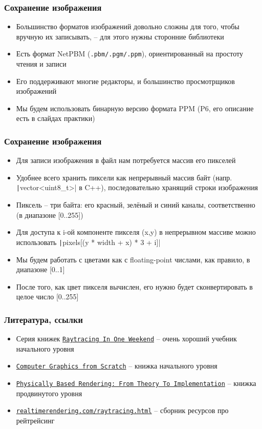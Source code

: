 \documentclass[10pt]{beamer}
\begin{document}
\begin{frame}
\frametitle{Сохранение изображения}
\begin{itemize}
\item Большинство форматов изображений довольно сложны для того, чтобы вручную их записывать, -- для этого нужны сторонние библиотеки
\pause
\item Есть формат NetPBM (\texttt{.pbm/.pgm/.ppm}), ориентированный на простоту чтения и записи
\pause
\item Его поддерживают многие редакторы, и большинство просмотрщиков изображений
\pause
\item Мы будем использовать бинарную версию формата PPM (P6, его описание есть в слайдах практики)
\end{itemize}
\end{frame}

\begin{frame}
\frametitle{Сохранение изображения}
\begin{itemize}
\item Для записи изображения в файл нам потребуется массив его пикселей
\pause
{}
\item Удобнее всего хранить пиксели как непрерывный массив байт (напр. \texttt|vector<uint8_t>| в C++), последовательно хранящий строки изображения
\pause
\item Пиксель -- три байта: его {\color{red}красный}, {\color{green}зелёный} и {\color{blue}синий} каналы, соответственно (в диапазоне [0..255])
\pause
\item Для доступа к i-ой компоненте пикселя (x,y) в непрерывном массиве можно использовать \texttt|pixels[(y * width + x) * 3 + i]|
\pause
\item Мы будем работать с цветами как с floating-point числами, как правило, в диапазоне [0..1]
\pause
\item После того, как цвет пикселя вычислен, его нужно будет сконвертировать в целое число [0..255]
\end{itemize}
\end{frame}

\begin{frame}
\frametitle{Литература, ссылки}
\begin{itemize}
\item Серия книжек \href{https://raytracing.github.io/}{\texttt{Raytracing In One Weekend}} -- очень хороший учебник начального уровня
\item \href{https://www.gabrielgambetta.com/computer-graphics-from-scratch/}{\texttt{Computer Graphics from Scratch}} -- книжка начального уровня
\item \href{https://www.pbr-book.org/}{\texttt{Physically Based Rendering: From Theory To Implementation}} -- книжка продвинутого уровня
\item \href{https://www.realtimerendering.com/raytracing.html}{\texttt{realtimerendering.com/raytracing.html}} -- сборник ресурсов про рейтрейсинг
\end{itemize}
\end{frame}
\end{document}

